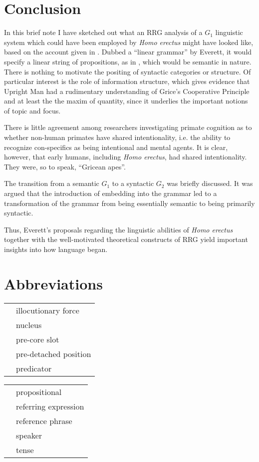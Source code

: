 \documentclass[output=paper,colorlinks,citecolor=brown]{langscibook}
\begin{document}
\section{Conclusion}\label{sec:vanvalin:6}
In this brief note I have sketched out what an RRG analysis of a $G_1$ linguistic system which could have been employed by \emph{Homo erectus} might have looked like, based on the account given in \citet{everett2017language}.  Dubbed a “linear grammar” by Everett, it would specify a linear string of propositions, as in , which would be semantic in nature.  There is nothing to motivate the positing of syntactic categories or structure.  Of particular interest is the role of information structure, which gives evidence that Upright Man had a rudimentary understanding of Grice’s Cooperative Principle and at least the the maxim of quantity, since it underlies the important notions of topic and focus.  

There is little agreement among researchers investigating primate cognition as to whether non-human primates have shared intentionality, i.e. the ability to recognize con-specifics as being intentional and mental agents.  It is clear, however, that early humans, including \emph{Homo erectus}, had shared intentionality.  They were, so to speak, “Gricean apes”.

The transition from a semantic $G_1$ to a syntactic $G_2$ was briefly discussed.  It was argued that the introduction of embedding into the grammar led to a transformation of the grammar from being essentially semantic to being primarily syntactic.

Thus, Everett’s proposals regarding the linguistic abilities of \emph{Homo erectus} together with the well-motivated theoretical constructs of RRG yield important insights into how language began.

\section*{Abbreviations}
\begin{tabularx}{.5\textwidth}{@{}lQ}
 & illocutionary force \\
 & nucleus \\
 & pre-core slot \\
 & pre-detached position \\
 & predicator \\
\end{tabularx}\begin{tabularx}{.5\textwidth}{lQ@{}}
 & propositional \\
 & referring expression \\
 & reference phrase \\
 & speaker \\
 & tense \\
\end{tabularx}

\printbibliography[heading=subbibliography,notkeyword=this]
\end{document}

